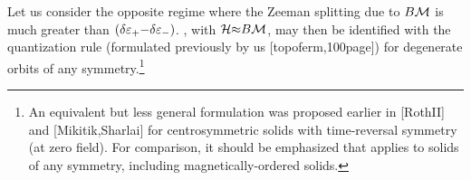 \documentclass[aps, prb, showpacs, twocolumn, notitlepage, superscriptaddress]{revtex4-1}
\begin{document}


 Let us consider the opposite regime where the Zeeman splitting due to $B{\cal M}$ is much greater than $(\delta \varepsilon_+{-}\delta\varepsilon_-)$. , with ${\cal H}{\approx}B{\cal M}$, may then be identified with the quantization rule (formulated previously by us [topoferm,100page]) for degenerate orbits of any symmetry.\footnote{An equivalent but less general formulation was proposed earlier in [RothII] and [Mikitik,Sharlai] for centrosymmetric solids with time-reversal symmetry (at zero field). For comparison, it should be emphasized that  applies to solids of any symmetry, including magnetically-ordered solids.}	   






\end{document}
